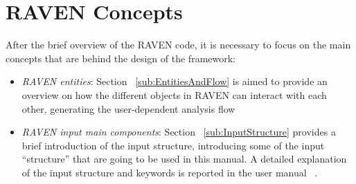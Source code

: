 \section{RAVEN Concepts}
\label{sec:RAVENconcept}
After the brief overview of the RAVEN code, it is necessary to focus on the main concepts that are behind the design of the framework:
\begin{itemize}
    \item \textit{RAVEN entities}: Section ~\ref{sub:EntitiesAndFlow} is aimed to provide an overview on how the different objects in
    RAVEN can interact with each other, generating the user-dependent analysis flow
    \item \textit{RAVEN input main components}: Section ~\ref{sub:InputStructure} provides a brief introduction of the input structure, introducing
    some of the input ``structure'' that are going to be used in this manual. A detailed explanation of the
    input structure and keywords is reported in the user manual ~\cite{RAVENuserManual}.
\end{itemize}
